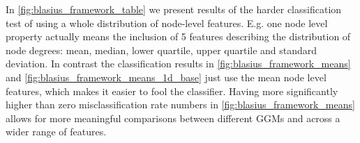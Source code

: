 In \cref{fig:blasius_framework_table} we present results of the harder classification test of using a whole distribution of node-level features. E.g. one node level property   actually means the inclusion of 5 features describing the distribution of node degrees: mean, median, lower quartile, upper quartile and standard deviation. In contrast the classification results in \cref{fig:blasius_framework_means} and \cref{fig:blasius_framework_means_1d_base} just use the mean node level features, which makes it easier to fool the classifier. Having more significantly higher than zero misclassification rate numbers in \cref{fig:blasius_framework_means} allows for more  meaningful comparisons between different GGMs and across a wider range of features.



